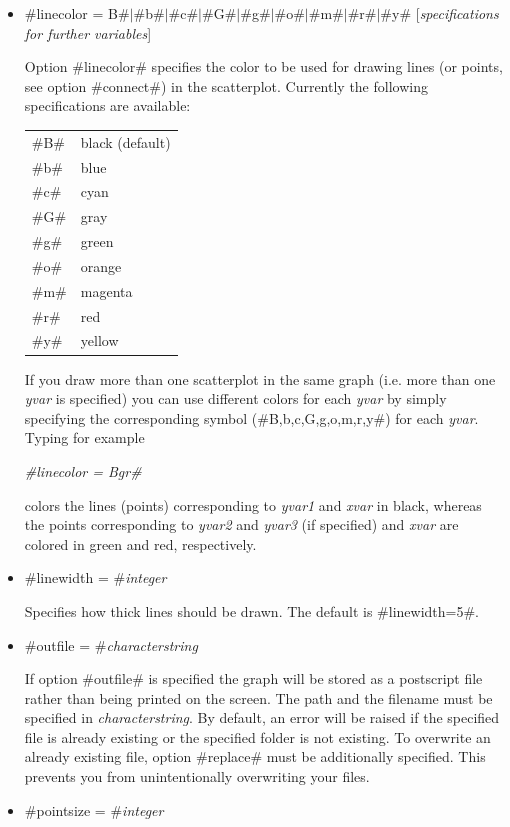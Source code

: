 \begin{itemize}
 \item #linecolor = B#$|$#b#$|$#c#$|$#G#$|$#g#$|$#o#$|$#m#$|$#r#$|$#y# [{\em specifications for further
variables}]

Option #linecolor# specifies the color to be used for drawing
lines (or points, see option #connect#) in the scatterplot.
Currently the following specifications are available:

\begin{tabular}{ll}
#B# & black (default) \\
#b# & blue \\
#c# & cyan \\
#G# & gray \\
#g# & green \\
#o# & orange \\
#m# & magenta \\
#r# & red \\
#y# & yellow
\end{tabular}

If you draw more than one scatterplot in the same graph (i.e. more
than one {\em yvar} is specified) you can use different colors for
each {\em yvar} by simply specifying the corresponding symbol
(#B,b,c,G,g,o,m,r,y#) for each {\em yvar}. Typing for example

{\em #linecolor = Bgr#}

colors the lines (points) corresponding to {\em yvar1} and {\em
xvar} in black, whereas the points corresponding to {\em yvar2}
and {\em yvar3} (if specified) and {\em xvar} are colored in green
and red, respectively.

\item #linewidth = #{\em integer}

Specifies how thick lines should be drawn. The default is
#linewidth=5#.

\item #outfile = #{\em characterstring}

If option #outfile# is specified the graph will be stored as a
postscript file rather than being printed on the screen. The path
and the filename must be specified in {\em characterstring}. By
default, an error will be raised if the specified file is already
existing or the specified folder is not existing. To overwrite  an
already existing file, option #replace# must be additionally
specified. This prevents you from unintentionally overwriting your
files.

\item #pointsize = #{\em integer}


\end{itemize}
